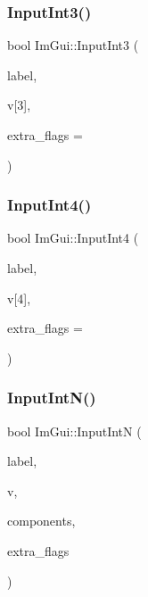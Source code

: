 \mbox{\label{namespace_im_gui_ab02fc4a19ed153984d3585296e1c74b1}} 
\subsubsection{\texorpdfstring{Input\+Int3()}{InputInt3()}}
{\footnotesize\ttfamily bool Im\+Gui\+::\+Input\+Int3 (\begin{DoxyParamCaption}\item[{const char $\ast$}]{label,  }\item[{int}]{v\mbox{[}3\mbox{]},  }\item[{\mbox{\hyperlink{imgui_8h_a7d2c6153a6b9b5d3178ce82434ac9fb8}{Im\+Gui\+Input\+Text\+Flags}}}]{extra\+\_\+flags = {} }\end{DoxyParamCaption})}

\mbox{\label{namespace_im_gui_ac714ecf202c82dc6caa0cbf344c85a13}} 
\subsubsection{\texorpdfstring{Input\+Int4()}{InputInt4()}}
{\footnotesize\ttfamily bool Im\+Gui\+::\+Input\+Int4 (\begin{DoxyParamCaption}\item[{const char $\ast$}]{label,  }\item[{int}]{v\mbox{[}4\mbox{]},  }\item[{\mbox{\hyperlink{imgui_8h_a7d2c6153a6b9b5d3178ce82434ac9fb8}{Im\+Gui\+Input\+Text\+Flags}}}]{extra\+\_\+flags = {} }\end{DoxyParamCaption})}

\mbox{\label{namespace_im_gui_a9b9aaec8d095156b74ee191b532fa137}} 
\subsubsection{\texorpdfstring{Input\+Int\+N()}{InputIntN()}}
{\footnotesize\ttfamily bool Im\+Gui\+::\+Input\+IntN (\begin{DoxyParamCaption}\item[{const char $\ast$}]{label,  }\item[{int $\ast$}]{v,  }\item[{int}]{components,  }\item[{\mbox{\hyperlink{imgui_8h_a7d2c6153a6b9b5d3178ce82434ac9fb8}{Im\+Gui\+Input\+Text\+Flags}}}]{extra\+\_\+flags }\end{DoxyParamCaption})}

